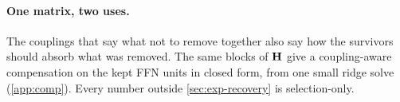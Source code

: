 \paragraph{One matrix, two uses.} The couplings that say what not to remove together also say how the
survivors should absorb what was removed. The same blocks of $\mathbf{H}$ give a coupling-aware
compensation on the kept FFN units in closed form, from one small ridge solve (\cref{app:comp}). Every
number outside \cref{sec:exp-recovery} is selection-only.
